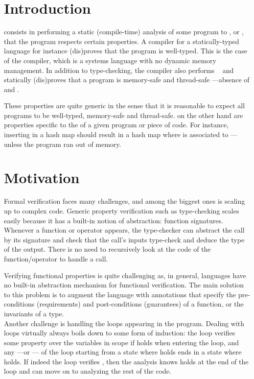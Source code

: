 

\section{Introduction}%
\label{sec:intro}

 consists in performing a static (compile-time) analysis of some program
to , or , that the program respects certain properties. A compiler for a
statically-typed language for instance (dis)proves that the program is well-typed. This is the case
of the \rust{} compiler, which is a systems language with no dynamic memory management. In addition
to type-checking, the \rust{} compiler also performs ~\cite{rust} and
statically (dis)proves that a program is memory-safe and thread-safe ---absence of  and .

These properties are quite generic in the sense that it is reasonable to expect all programs to be
well-typed, memory-safe and thread-safe.  on the other hand are
properties specific to the  of a given program or piece of code. For instance,
inserting  in a hash map should result in a hash map where  is
associated to  ---unless the program ran out of memory.


\section{Motivation}%
\label{sec:motivation}

Formal verification faces many challenges, and among the biggest ones is scaling up to complex
code. Generic property verification such as type-checking scales easily because it has a built-in
notion of abstraction: function signatures. Whenever a function or operator appears, the
type-checker can abstract the call by its signature and check  that the call's inputs
type-check and  deduce the type of the output. There is no need to recursively look at the
code of the function/operator to handle a call.

Verifying functional properties is quite challenging as, in general, languages have no built-in
abstraction mechanism for functional verification. The main solution to this problem is to augment
the language with  annotations that specify the pre-conditions (requirements) and
post-conditions (guarantees) of a function, or the invariants of a type.
\\
Another challenge is handling the loops appearing in the program. Dealing with loops virtually
always boils down to some form of induction: the loop verifies some property  over the
variables in scope if   holds when entering the loop, and  any  ---or --- of the loop starting from a state where  holds ends in a
state where  holds. If indeed the loop verifies , then the analysis knows 
holds at the end of the loop and can move on to analyzing the rest of the code.

